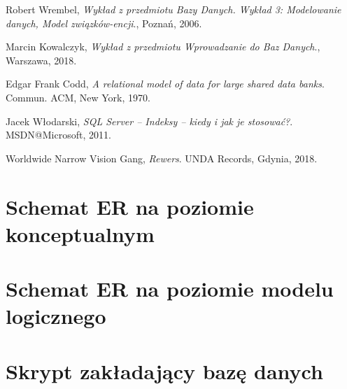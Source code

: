 \documentclass{mwrep}
\begin{document}
\begin{thebibliography}{9}
	  Robert Wrembel,
	  \emph{Wykład z przedmiotu Bazy Danych. Wykład 3: Modelowanie danych, Model związków-encji}.,
	  Poznań,
	  2006.

	
	  Marcin Kowalczyk,
	  \emph{Wykład z przedmiotu Wprowadzanie do Baz Danych}.,
	  Warszawa,
	  2018.

	  Edgar Frank Codd,
	  \emph{A relational model of data for large shared data banks}.
	  Commun. ACM,
	  New York,
	  1970.

	  Jacek Włodarski,
	  \emph{SQL Server – Indeksy – kiedy i jak je stosować?}.
	  MSDN@Microsoft,
	  2011.

	  Worldwide Narrow Vision Gang,
	  \emph{Rewers}.
	  UNDA Records,
	  Gdynia,
	  2018.
	
\end{thebibliography}

\appendix
\chapter{Schemat ER na poziomie konceptualnym}

\chapter{Schemat ER na poziomie modelu logicznego}

\chapter{Skrypt zakładający bazę danych}

\clearpage
{}
	
\end{document}
